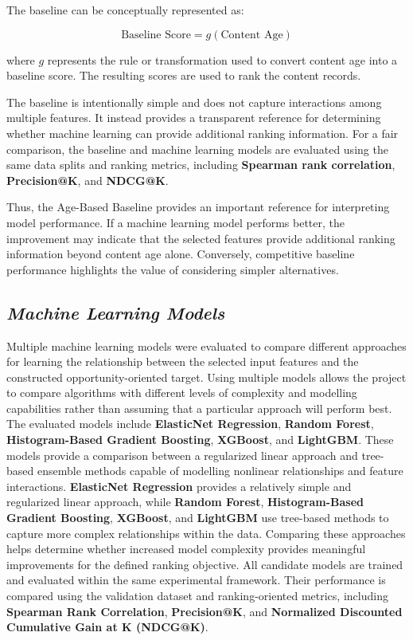 \documentclass[12pt,a4paper]{report}
\begin{document}
The baseline can be conceptually represented as:

\begin{equation}
\text{Baseline Score} = g(\text{Content Age})
\end{equation}

where $g$ represents the rule or transformation used to convert content age into a baseline score. The resulting scores are used to rank the content records.

The baseline is intentionally simple and does not capture interactions among multiple features. It instead provides a transparent reference for determining whether machine learning can provide additional ranking information. For a fair comparison, the baseline and machine learning models are evaluated using the same data splits and ranking metrics, including \textbf{Spearman rank correlation}, \textbf{Precision@K}, and \textbf{NDCG@K}.

Thus, the Age-Based Baseline provides an important reference for interpreting model performance. If a machine learning model performs better, the improvement may indicate that the selected features provide additional ranking information beyond content age alone. Conversely, competitive baseline performance highlights the value of considering simpler alternatives.

\subsection{\textit{Machine Learning Models}}

Multiple machine learning models were evaluated to compare different approaches for learning the relationship between the selected input features and the constructed opportunity-oriented target. Using multiple models allows the project to compare algorithms with different levels of complexity and modelling capabilities rather than assuming that a particular approach will perform best. The evaluated models include \textbf{ElasticNet Regression}, \textbf{Random Forest}, \textbf{Histogram-Based Gradient Boosting}, \textbf{XGBoost}, and \textbf{LightGBM}. These models provide a comparison between a regularized linear approach and tree-based ensemble methods capable of modelling nonlinear relationships and feature interactions. \textbf{ElasticNet Regression} provides a relatively simple and regularized linear approach, while \textbf{Random Forest}, \textbf{Histogram-Based Gradient Boosting}, \textbf{XGBoost}, and \textbf{LightGBM} use tree-based methods to capture more complex relationships within the data. Comparing these approaches helps determine whether increased model complexity provides meaningful improvements for the defined ranking objective. All candidate models are trained and evaluated within the same experimental framework. Their performance is compared using the validation dataset and ranking-oriented metrics, including \textbf{Spearman Rank Correlation}, \textbf{Precision@K}, and \textbf{Normalized Discounted Cumulative Gain at K (NDCG@K)}.
\end{document}
